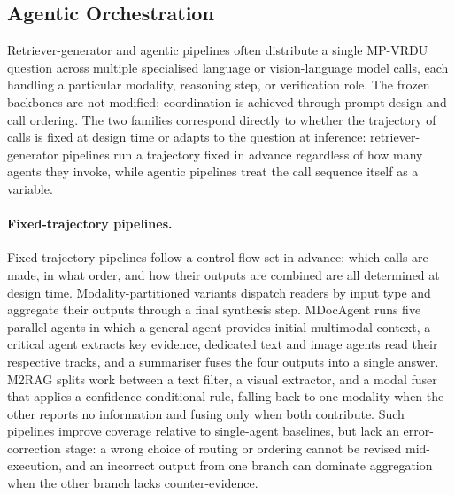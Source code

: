 \documentclass[11pt]{article}
\begin{document}
\subsection{Agentic Orchestration}
\label{sec:agent-orchestration}

Retriever-generator and agentic pipelines often distribute a single MP-VRDU question across multiple specialised language or vision-language model calls, each handling a particular modality, reasoning step, or verification role. The frozen backbones are not modified; coordination is achieved through prompt design and call ordering. The two families correspond directly to whether the trajectory of calls is fixed at design time or adapts to the question at inference: retriever-generator pipelines run a trajectory fixed in advance regardless of how many agents they invoke, while agentic pipelines treat the call sequence itself as a variable.

\paragraph{Fixed-trajectory pipelines.} Fixed-trajectory pipelines follow a control flow set in advance: which calls are made, in what order, and how their outputs are combined are all determined at design time. Modality-partitioned variants dispatch readers by input type and aggregate their outputs through a final synthesis step. MDocAgent \cite{han2025mdocagent} runs five parallel agents in which a general agent provides initial multimodal context, a critical agent extracts key evidence, dedicated text and image agents read their respective tracks, and a summariser fuses the four outputs into a single answer. M2RAG \cite{duan2025m2rag} splits work between a text filter, a visual extractor, and a modal fuser that applies a confidence-conditional rule, falling back to one modality when the other reports no information and fusing only when both contribute. Such pipelines improve coverage relative to single-agent baselines, but lack an error-correction stage: a wrong choice of routing or ordering cannot be revised mid-execution, and an incorrect output from one branch can dominate aggregation when the other branch lacks counter-evidence.
\end{document}
